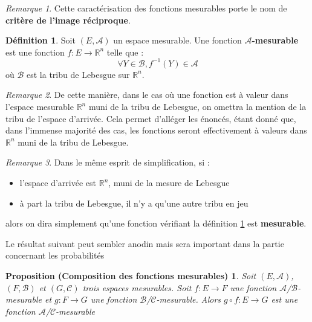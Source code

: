 \documentclass[french]{report}
\theoremstyle{plain}
\newtheorem*{compmes}{Proposition (Composition des fonctions mesurables)}
\theoremstyle{definition}
\newtheorem{defi}{Définition}[section]
\theoremstyle{remark}
\newtheorem{rem}{Remarque}[section]
\newcommand\itemb{\item[$\bullet$]}
\begin{document}
\begin{rem}
  Cette caractérisation des fonctions mesurables porte le nom de \textbf{critère de l'image réciproque}.
\end{rem}

\begin{defi}
  \label{def:fctmes2}
  Soit $\left(E, \mathcal{A}\right)$ un espace mesurable. Une fonction $\mathcal{A}$\textbf{-mesurable} est une fonction $f:E \longrightarrow \mathbb{R}^n$ telle que :
  $$\forall Y \in \mathcal{B}, f^{-1}(Y) \in \mathcal{A}$$
  où $\mathcal{B}$ est la tribu de Lebesgue sur $\mathbb{R}^n$.
\end{defi}

\begin{rem}
  De cette manière, dans le cas où une fonction est à valeur dans l'espace mesurable $\mathbb{R}^n$ muni de la tribu de Lebesgue, on omettra la mention de la tribu de l'espace d'arrivée.
  Cela permet d'alléger les énoncés, étant donné que, dans l'immense majorité des cas, les fonctions seront effectivement à valeurs dans $\mathbb{R}^n$ muni de la tribu de Lebesgue.
\end{rem}

\begin{rem}
  Dans le même esprit de simplification, si :
  \begin{itemize}
    \itemb l'espace d'arrivée est $\mathbb{R}^n$, muni de la mesure de Lebesgue
    \itemb à part la tribu de Lebesgue, il n'y a qu'une autre tribu en jeu
  \end{itemize}

  alors on dira simplement qu'une fonction vérifiant la définition \ref{def:fctmes2} est \textbf{mesurable}.
\end{rem}

Le résultat suivant peut sembler anodin mais sera important dans la partie concernant les probabilités

\begin{compmes}
  Soit $\left(E,\mathcal{A}\right)$, $\left(F,\mathcal{B}\right)$ et $\left(G,\mathcal{C}\right)$ trois espaces mesurables.
  Soit $f : E \longrightarrow F$ une fonction $\mathcal{A}$/$\mathcal{B}$-mesurable et $g : F \longrightarrow G$ une fonction $\mathcal{B}$/$\mathcal{C}$-mesurable.
  Alors $g \circ f : E \longrightarrow G$ est une fonction $\mathcal{A}$/$\mathcal{C}$-mesurable
\end{compmes}

\tableofcontents
\end{document}
